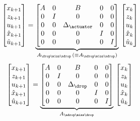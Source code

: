 %
\begin{equation}
    \begin{bmatrix}
        x_{k+1} \\
        z_{k+1} \\
        u_{k+1} \\
        \hat x_{k+1} \\
        \hat u_{k+1}
    \end{bmatrix} = \underbrace{\begin{bmatrix}
        A & 0 & B & 0 & 0 \\
        0 & I & 0 & 0 & 0 \\
        0 & 0 & \Delta_\actuator & 0 & 0 \\
        0 & 0 & 0 & I & 0 \\
        0 & 0 & 0 & 0 & I \\
    \end{bmatrix}}_{A_{\drop\miss\ndrop}\, (\equiv A_{\ndrop\miss\ndrop})}\, \begin{bmatrix}
        x_{k} \\
        z_{k} \\
        u_{k} \\
        \hat x_{k} \\
        \hat u_{k}
    \end{bmatrix}
\end{equation}
%
\begin{equation}
    \begin{bmatrix}
        x_{k+1} \\
        z_{k+1} \\
        u_{k+1} \\
        \hat x_{k+1} \\
        \hat u_{k+1}
    \end{bmatrix} = \underbrace{\begin{bmatrix}
        A & 0 & B & 0 & 0 \\
        0 & I & 0 & 0 & 0 \\
        0 & 0 & \Delta_\drop & 0 & 0 \\
        0 & 0 & 0 & I & 0 \\
        0 & 0 & 0 & 0 & I \\
    \end{bmatrix}}_{A_{\ndrop\miss\drop}}\, \begin{bmatrix}
        x_{k} \\
        z_{k} \\
        u_{k} \\
        \hat x_{k} \\
        \hat u_{k}
    \end{bmatrix}
\end{equation}
